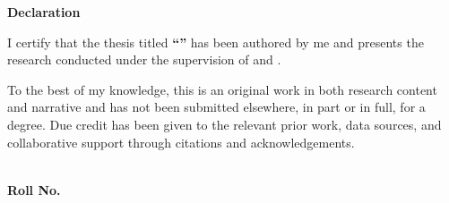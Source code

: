 \thispagestyle{plain}
\begin{center}
  {\huge\bfseries Declaration\par}
\end{center}
\vspace{1.5em}

I certify that the thesis titled \textbf{``\ThesisTitle''} has been authored
by me and presents the research conducted under the supervision of
\textbf{\ThesisSupervisor} and \textbf{\ThesisCoSupervisor}.

To the best of my knowledge, this is an original work in both research content
and narrative and has not been submitted elsewhere, in part or in full, for a
degree. Due credit has been given to the relevant prior work, data sources, and
collaborative support through citations and acknowledgements.

\vfill
\begin{flushright}
\textbf{\ThesisAuthor}\\
\textbf{Roll No.}\ \ThesisRollNumber\\
\ThesisDegreeShort\\
\ThesisDepartment\\
\ThesisInstitute\\
\ThesisInstituteAddress
\end{flushright}
